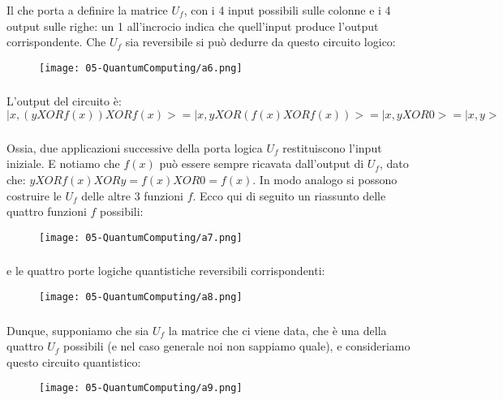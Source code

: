 \subsubsection{}
Il che porta a definire la matrice $U_f$,
con i 4 input possibili sulle colonne e i 4 output
sulle righe: un 1 all’incrocio indica che quell’input
produce l’output corrispondente.
Che $U_f$ sia reversibile si può dedurre da questo circuito logico:
\begin{figure}[h]
    \centering
    \texttt{[image: 05-QuantumComputing/a6.png]}
\end{figure}
\subsubsection{}
L’output del circuito è:
$$|x, (y XOR f(x)) XOR f(x)> =
|x, y XOR (f(x) XOR f(x))> = |x, y XOR 0> = |x, y>$$
\subsubsection{}
Ossia, due applicazioni successive della porta logica $U_f$ restituiscono
l’input iniziale. E notiamo che $f(x)$ può essere sempre ricavata
dall’output di $U_f$, dato che: $y XOR f(x) XOR y = f(x) XOR 0 = f(x)$.
In modo analogo si possono costruire le $U_f$ delle altre 3 funzioni $f$.
Ecco qui di seguito un riassunto delle quattro funzioni $f$ possibili:
\begin{figure}[h]
    \centering
    \texttt{[image: 05-QuantumComputing/a7.png]}
\end{figure}
\subsubsection{}
e le quattro porte logiche quantistiche reversibili corrispondenti:
\begin{figure}[h]
    \centering
    \texttt{[image: 05-QuantumComputing/a8.png]}
\end{figure}
\subsubsection{}
Dunque, supponiamo che sia $U_f$ la matrice che ci viene data, che è
una della quattro $U_f$ possibili (e nel caso generale noi non sappiamo
quale), e consideriamo questo circuito quantistico:
\begin{figure}[h]
    \centering
    \texttt{[image: 05-QuantumComputing/a9.png]}
\end{figure}
